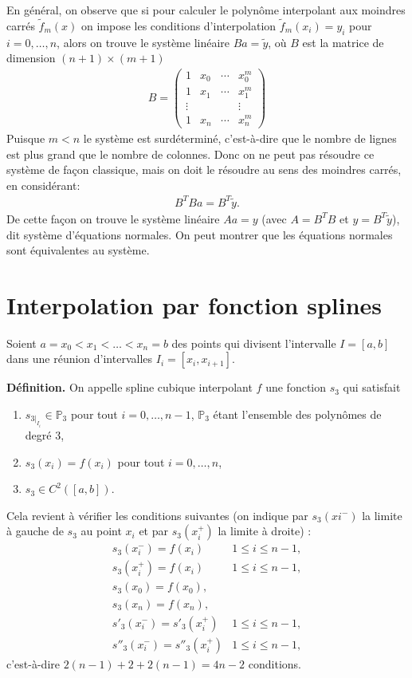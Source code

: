 En général, on observe que si pour calculer le polynôme interpolant aux moindres carrés 
$\tilde f_m(x)$
on impose les conditions d’interpolation
$\tilde f_m(x_i) = y_i$ 
pour $i = 0, \dots, n$, 
alors on trouve le système linéaire 
$Ba = \tilde y$, 
où $B$ est la matrice de dimension 
$(n + 1) \times (m + 1)$
\begin{eqnarray*}
	B=
	\begin{pmatrix}
		1 & x_0 & \cdots & x_0^m
		\\
		1 & x_1 & \cdots & x_1^m
		\\
		\vdots && & \vdots
		\\
		1 & x_n & \cdots & x_n^m
	\end{pmatrix}
\end{eqnarray*}
Puisque $m < n$ le système est surdéterminé, c’est-à-dire que le nombre de lignes est plus grand 
que le nombre de colonnes. Donc on ne peut pas résoudre ce système de façon classique, mais on 
doit le résoudre au sens des moindres carrés, en considérant:
\begin{eqnarray}
	B^TBa=B^T\tilde y.
\end{eqnarray}
De cette façon on trouve le système linéaire 
$Aa = y$ (avec $A = B^TB$ et $y = B^T\tilde y$), dit système 
d’équations normales. On peut montrer que les équations normales sont équivalentes au système.
\section{Interpolation par fonction splines}
Soient $a = x_0 < x_1 < \dots < x_n = b$ des points qui divisent l’intervalle $I = [a, b]$
dans une réunion d’intervalles $I_i = [x_i , x_{i+1}].$

\textbf{Définition.} On appelle spline cubique interpolant $f$ une fonction $s_3$ qui 
satisfait 
\begin{enumerate}
	\item $s_{3|_{I_i}}\in\mathbb P_3$ pour tout $i=0,\dots,n-1$, $\mathbb P_3$ étant l'ensemble des polynômes de degré 3,
	\item $s_3(x_i)=f(x_i)$ pour tout $i=0,\dots,n$,
	\item $s_3\in C^2([a,b])$.
\end{enumerate}

Cela revient à vérifier les conditions suivantes (on indique par 
$s_3(xi^-)$ la limite à gauche de $s_3$ au point $x_i$ 
et par 
$s_3(x_i^+)$ la limite à droite) :
\begin{eqnarray*}
s_3(x_i^-)=f(x_i)&1\leq i\leq n-1,\\
s_3(x_i^+)=f(x_i)&1\leq i\leq n-1,\\
s_3(x_0)=f(x_0),\\
s_3(x_n)=f(x_n),\\
s'_3(x_i^-)=s'_3(x_i^+)&1\leq i\leq n-1,\\
s''_3(x_i^-)=s''_3(x_i^+)&1\leq i\leq n-1,
\end{eqnarray*}
c’est-à-dire $2(n-1) + 2 + 2(n- 1) = 4n-2$ conditions. 

